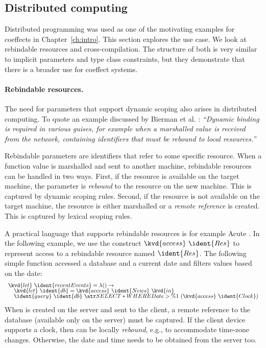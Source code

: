 \subsection{Distributed computing}
\label{sec:applications-flat-distr}

Distributed programming was used as one of the motivating examples for coeffects in 
Chapter~\ref{ch:intro}. This section explores the use case. We look at rebindable resources and
cross-compilation. The structure of both is very similar to implicit parameters and type
class constraints, but they demonstrate that there is a broader use for coeffect systems.


\paragraph{Rebindable resources.}

The need for parameters that support dynamic scoping also arises in distributed computing.
To quote an example discussed by Bierman et al. \cite{app-distributed-rebinding}: \emph{``Dynamic 
binding is required in various guises, for example when a marshalled value is received from the 
network, containing identifiers that must be rebound to local resources.''} 

Rebindable parameters are identifiers that refer to some specific resource. When a function value
is marshalled and sent to another machine, rebindable resources can be handled in two ways. 
First, if the resource is available on the target machine, the parameter is \emph{rebound} to
the resource on the new machine. This is captured by dynamic scoping rules. Second, if the 
resource is not available on the target machine, the resource is either marshalled or a \emph{remote 
reference} is created. This is captured by lexical scoping rules.

A practical language that supports rebindable resources is for example Acute \cite{app-distributed-acute}.
In the following example, we use the construct $\kvd{access}~\ident{Res}$ to represent
access to a rebindable resource named $\ident{Res}$. The following simple function accessed
a database and a current date and filters values based on the date:
%
\begin{equation*}
\begin{array}{l}
\kvd{let}~\ident{recentEvents} = \lambda () \rightarrow\\[-0.25em]
\quad\kvd{let}~\ident{db} = \kvd{access}~\ident{News}~\kvd{in}\\[-0.25em]
\quad\ident{query}~\ident{db}~\str{SELECT * WHERE Date > \%1}~(\kvd{access}~\ident{Clock})
\end{array}
\end{equation*}
%
When  is created on the server and sent to the client, a remote reference to 
the database (available only on the server) must be captured. If the client device supports a 
clock, then  can be locally \emph{rebound}, e.g., to accommodate time-zone changes. 
Otherwise, the date and time needs to be obtained from the server too.

